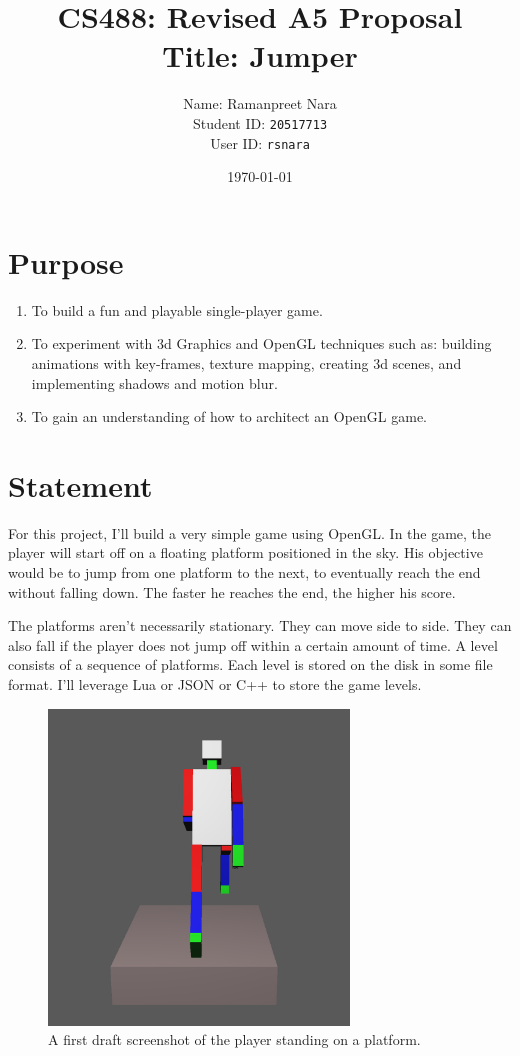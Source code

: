 \documentclass[11pt]{article}
\title{CS488: Revised A5 Proposal \\ \small{Title:  Jumper}}
\date{\today}
\author{Name: Ramanpreet Nara \\ Student ID: \texttt{20517713} \\ User ID: \texttt{rsnara}}
\begin{document}
\maketitle
\newpage
\section{Purpose}
\begin{enumerate}
\item To build a fun and playable single-player game.
\item To experiment with 3d Graphics and OpenGL techniques such as: building animations with key-frames, texture mapping, creating 3d scenes, and implementing shadows and motion blur.
\item To gain an understanding of how to architect an OpenGL game.
\end{enumerate}
\section{Statement}
For this project, I'll build a very simple game using OpenGL. In the game, the player will start off on a floating platform positioned in the sky. His objective would be to jump from one platform to the next, to eventually reach the end without falling down. The faster he reaches the end, the higher his score.

The platforms aren't necessarily stationary. They can move side to side. They can also fall if the player does not jump off within a certain amount of time. A level consists of a sequence of platforms. Each level is stored on the disk in some file format. I'll leverage Lua or JSON or C++ to store the game levels.

\begin{figure}[H]
\includegraphics[width=8cm]{screenshot}
\centering
\caption{A first draft screenshot of the player standing on a platform.}
\end{figure}
\end{document}
